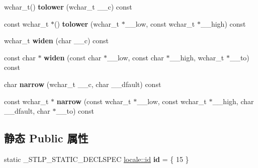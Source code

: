 \begin{DoxyCompactItemize}
wchar\+\_\+t() {\bfseries tolower} (wchar\+\_\+t \+\_\+\+\_\+c) const
\item 
\mbox{\label{classctype_3_01wchar__t_01_4_a6df5dd8f7d1c160941d117a3f86de80a}} 
const wchar\+\_\+t $\ast$() {\bfseries tolower} (wchar\+\_\+t $\ast$\+\_\+\+\_\+low, const wchar\+\_\+t $\ast$\+\_\+\+\_\+high) const
\item 
\mbox{\label{classctype_3_01wchar__t_01_4_a97c2d1571ac159f6f78363603f609fa6}} 
wchar\+\_\+t {\bfseries widen} (char \+\_\+\+\_\+c) const
\item 
\mbox{\label{classctype_3_01wchar__t_01_4_a5018eb141e28f3c74ad06c380ee39d0a}} 
const char $\ast$ {\bfseries widen} (const char $\ast$\+\_\+\+\_\+low, const char $\ast$\+\_\+\+\_\+high, wchar\+\_\+t $\ast$\+\_\+\+\_\+to) const
\item 
\mbox{\label{classctype_3_01wchar__t_01_4_a861a3d2a54da7a9327c62e7b50b7c9f9}} 
char {\bfseries narrow} (wchar\+\_\+t \+\_\+\+\_\+c, char \+\_\+\+\_\+dfault) const
\item 
\mbox{\label{classctype_3_01wchar__t_01_4_a645bc534f41891cd91f2df26eeeee49a}} 
const wchar\+\_\+t $\ast$ {\bfseries narrow} (const wchar\+\_\+t $\ast$\+\_\+\+\_\+low, const wchar\+\_\+t $\ast$\+\_\+\+\_\+high, char \+\_\+\+\_\+dfault, char $\ast$\+\_\+\+\_\+to) const
\end{DoxyCompactItemize}
\subsection*{静态 Public 属性}
\begin{DoxyCompactItemize}
\item 
\mbox{\label{classctype_3_01wchar__t_01_4_a9e1f6345e8b50dd0898ddcaac256d256}} 
static \+\_\+\+S\+T\+L\+P\+\_\+\+S\+T\+A\+T\+I\+C\+\_\+\+D\+E\+C\+L\+S\+P\+EC \hyperlink{classlocale_1_1id}{locale\+::id} {\bfseries id} = \{ 15 \}
\end{DoxyCompactItemize}
